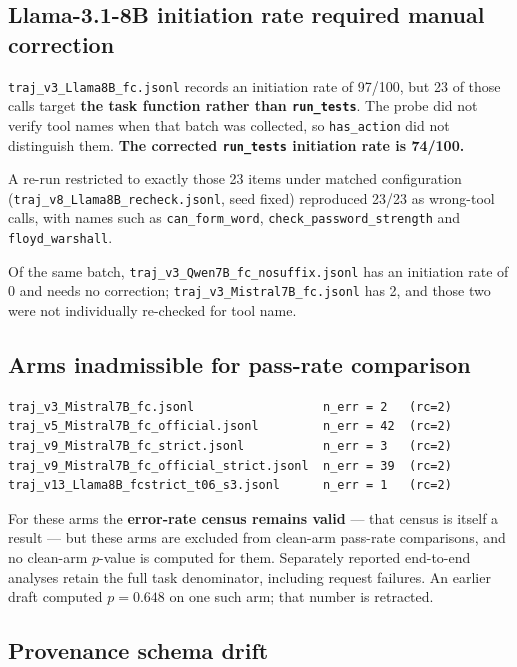 \subsection{Llama-3.1-8B initiation rate required manual correction}

\texttt{traj\_v3\_Llama8B\_fc.jsonl} records an initiation rate of 97/100, but 23 of those
calls target \textbf{the task function rather than \texttt{run\_tests}}. The probe did not
verify tool names when that batch was collected, so \texttt{has\_action} did not distinguish
them. \textbf{The corrected \texttt{run\_tests} initiation rate is 74/100.}

A re-run restricted to exactly those 23 items under matched configuration
(\texttt{traj\_\allowbreak v8\_\allowbreak Llama8B\_\allowbreak recheck.jsonl}, seed fixed) reproduced 23/23 as wrong-tool
calls, with names such as \texttt{can\_\allowbreak form\_\allowbreak word}, \texttt{check\_\allowbreak password\_\allowbreak strength} and
\texttt{floyd\_warshall}.

Of the same batch, \texttt{traj\_v3\_Qwen7B\_fc\_nosuffix.jsonl} has an initiation rate of
0 and needs no correction; \texttt{traj\_v3\_Mistral7B\_fc.jsonl} has 2, and those two were
not individually re-checked for tool name.

\subsection{Arms inadmissible for pass-rate comparison}

{\footnotesize
\begin{verbatim}
traj_v3_Mistral7B_fc.jsonl                  n_err = 2   (rc=2)
traj_v5_Mistral7B_fc_official.jsonl         n_err = 42  (rc=2)
traj_v9_Mistral7B_fc_strict.jsonl           n_err = 3   (rc=2)
traj_v9_Mistral7B_fc_official_strict.jsonl  n_err = 39  (rc=2)
traj_v13_Llama8B_fcstrict_t06_s3.jsonl      n_err = 1   (rc=2)
\end{verbatim}
}

For these arms the \textbf{error-rate census remains valid} --- that census is itself a
result --- but these arms are excluded from clean-arm pass-rate comparisons, and no
clean-arm $p$-value is computed for them. Separately reported end-to-end analyses retain
the full task denominator, including request failures. An earlier draft computed $p=0.648$ on one such arm; that number is
retracted.

\subsection{Provenance schema drift}

